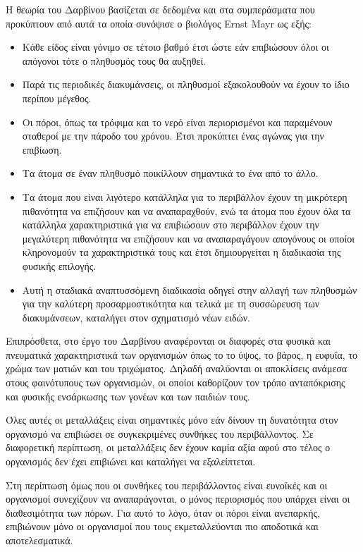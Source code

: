 Η θεωρία του Δαρβίνου βασίζεται σε δεδομένα και στα συμπεράσματα που προκύπτουν από αυτά τα οποία συνόψισε ο βιολόγος Ernst Mayr ως εξής:
\begin{itemize}
  \item Κάθε είδος είναι γόνιμο σε τέτοιο βαθμό έτσι ώστε εάν επιβιώσουν όλοι οι απόγονοι τότε ο πληθυσμός τους θα αυξηθεί.
  \item Παρά τις περιοδικές διακυμάνσεις, οι πληθυσμοί εξακολουθούν να έχουν το ίδιο περίπου μέγεθος.
  \item Οι πόροι, όπως τα τρόφιμα και το νερό είναι περιορισμένοι και παραμένουν σταθεροί με την πάροδο του χρόνου. Έτσι προκύπτει ένας αγώνας για την επιβίωση.
  \item Τα άτομα σε έναν πληθυσμό ποικίλλουν σημαντικά το ένα από το άλλο.


  \item Τα άτομα που είναι λιγότερο κατάλληλα για το περιβάλλον έχουν τη μικρότερη πιθανότητα να επιζήσουν και να αναπαραχθούν, ενώ τα άτομα που έχουν όλα τα κατάλληλα χαρακτηριστικά για να επιβιώσουν στο περιβάλλον έχουν την μεγαλύτερη πιθανότητα να επιζήσουν και να αναπαραγάγουν απογόνους οι οποίοι κληρονομούν τα χαρακτηριστικά τους και έτσι δημιουργείται η διαδικασία της φυσικής επιλογής.

  \item Αυτή η σταδιακά αναπτυσσόμενη διαδικασία οδηγεί στην αλλαγή των πληθυσμών για την καλύτερη προσαρμοστικότητα και τελικά με τη συσσώρευση των διακυμάνσεων, καταλήγει στον σχηματισμό νέων ειδών.
\end{itemize}
Επιπρόσθετα, στο έργο του Δαρβίνου αναφέρονται οι διαφορές στα φυσικά και πνευματικά χαρακτηριστικά των οργανισμών \cite{Adamidis} όπως το το ύψος, το βάρος, η ευφυΐα, το χρώμα των ματιών και του τριχώματος. Δηλαδή αναλύονται οι αποκλίσεις ανάμεσα στους φαινότυπους των οργανισμών, οι οποίοι καθορίζουν τον τρόπο ανταπόκρισης και φυσικής ενσάρκωσης των γονέων και των παιδιών τους.

Όλες αυτές οι μεταλλάξεις είναι σημαντικές μόνο εάν δίνουν τη δυνατότητα στον οργανισμό να επιβιώσει σε συγκεκριμένες συνθήκες του περιβάλλοντος. Σε διαφορετική περίπτωση, οι μεταλλάξεις δεν έχουν καμία αξία αφού στο τέλος ο οργανισμός δεν έχει επιβιώνει και καταλήγει να εξαλείπτεται.

Στη περίπτωση όμως που οι συνθήκες του περιβάλλοντος είναι ευνοϊκές και οι οργανισμοί συνεχίζουν να αναπαράγονται, ο μόνος περιορισμός που υπάρχει είναι οι διαθεσιμότητα των πόρων. Για αυτό το λόγο, όταν οι πόροι είναι ανεπαρκής, επιβιώνουν μόνο οι οργανισμοί που τους εκμεταλλεύονται πιο αποδοτικά και αποτελεσματικά.

